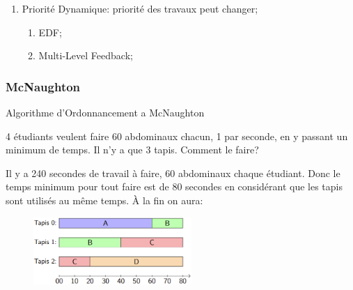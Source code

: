 \documentclass{article}
\begin{document}
\begin{enumerate}[rightmargin=\leftmargin]
\begin{enumerate}[noitemsep, rightmargin=\leftmargin]
\begin{enumerate}
            \item Priorité Dynamique: priorité des travaux peut changer;
            \begin{enumerate}[noitemsep]
                \item EDF;
                \item Multi-Level Feedback;
            \end{enumerate}
        \end{enumerate}
    \end{enumerate}
\end{enumerate}
    

\subsubsection*{McNaughton}
\begin{definition}
    Algorithme d'Ordonnancement a McNaughton
    \begin{example}
        4 étudiants veulent faire 60 abdominaux chacun, 1 par seconde, en y passant un minimum de temps. Il n'y a que 3 tapis. Comment le faire?
    \end{example}
    \begin{resolution}
        Il y a 240 secondes de travail à faire, 60 abdominaux chaque étudiant. Donc le temps minimum pour tout faire est de 80 secondes en considérant que les tapis sont utilisés au même temps. À la fin on aura:
        \begin{figure}[H]
            \centering
            \includegraphics[width=60mm]{images/mcNaughton_output.png}
        \end{figure}
    \end{resolution}
\end{definition}
\end{document}
